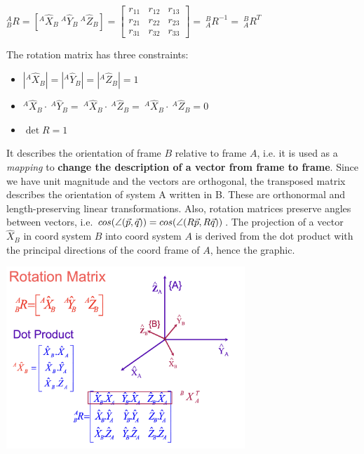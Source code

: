 \begin{center}
	$^{A}_{B}R = [^{A}\hat{X}_{B}\ ^{A}\hat{Y}_{B}\ ^{A}\hat{Z}_{B}] = 
	\begin{bmatrix} r_{11} & r_{12} & r_{13} \\ r_{21} & r_{22} & r_{23} \\ r_{31} & r_{32} & r_{33} \end{bmatrix} =\ ^{B}_{A} R^{-1} =\ ^{B}_{A} R^T$ \\
\end{center}
The rotation matrix has three constraints:
\begin{itemize}
	\item $|^{A}\hat{X}_{B}| = |^{A}\hat{Y}_{B}| = |^{A}\hat{Z}_{B}| = 1$
	\item $^{A}\hat{X}_{B} \cdot\ ^{A}\hat{Y}_{B} =\ ^{A}\hat{X}_{B} \cdot\ ^{A}\hat{Z}_{B} =\ ^{A}\hat{X}_{B} \cdot\ ^{A}\hat{Z}_{B} = 0$
	\item $\det{R} = 1$
\end{itemize}	
	
It describes the orientation of frame $B$ relative to frame $A$, i.e. it is used as a \textit{mapping} to \textbf{change the description of a vector from frame to frame}. Since we have unit magnitude and the vectors are orthogonal, the transposed matrix describes the orientation of system A written in B. These are orthonormal and length-preserving linear transformations. Also, rotation matrices preserve angles between vectors, i.e. $cos(\angle (\vect{p}, \vect{q})) = cos(\angle (R\vect{p}, R\vect{q}))$. The projection of a vector $\hat{X}_B$ in coord system $B$ into coord system $A$ is derived from the dot product with the principal directions of the coord frame of $A$, hence the graphic.
	
\begin{center}
	\includegraphics[width=9cm]{sections/imgs/2_rotation_matrix.png}
\end{center}

